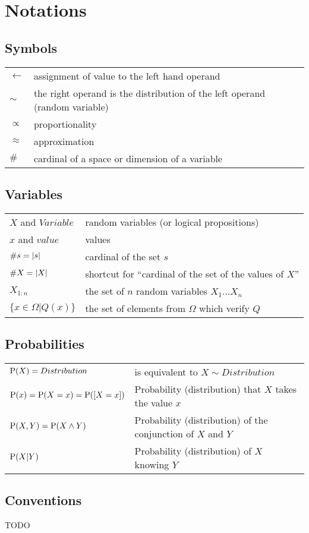 \chapter*{Notations}

\section*{Symbols}
\begin{tabular}{ll}
$\leftarrow$ & assignment of value to the left hand operand \\
$\sim$ & the right operand is the distribution of the left operand (random variable) \\
$\propto$ & proportionality \\
$\approx$ & approximation \\
$\#$ & cardinal of a space or dimension of a variable \\
\end{tabular}

\section*{Variables}
\begin{tabular}{ll}
$X$ and $Variable$ & random variables (or logical propositions) \\
$x$ and $value$ & values \\
$\#s = \left\lvert s\right\rvert$ & cardinal of the set $s$ \\
$\#X = \left\lvert X\right\rvert$ & shortcut for ``cardinal of the set of the values of $X$'' \\
$X_{1:n}$ & the set of $n$ random variables $X_1 \dots X_n$ \\
$\{x \in \Omega | Q(x)\}$ & the set of elements from $\Omega$ which verify $Q$ \\
\end{tabular}

\section*{Probabilities}

\begin{tabular}{ll}
$\mathrm{P}(X) = Distribution$ & is equivalent to $X \sim Distribution$\\
$\mathrm{P}(x) = \mathrm{P}(X=x) = \mathrm{P}([X=x])$ & Probability (distribution) that $X$ takes the value $x$ \\
$\mathrm{P}(X,Y) = \mathrm{P}(X\wedge Y)$ & Probability (distribution) of the conjunction of $X$ and $Y$ \\
$\mathrm{P}(X|Y)$ & Probability (distribution) of $X$ knowing $Y$ \\
\end{tabular}

\section*{Conventions}
TODO
